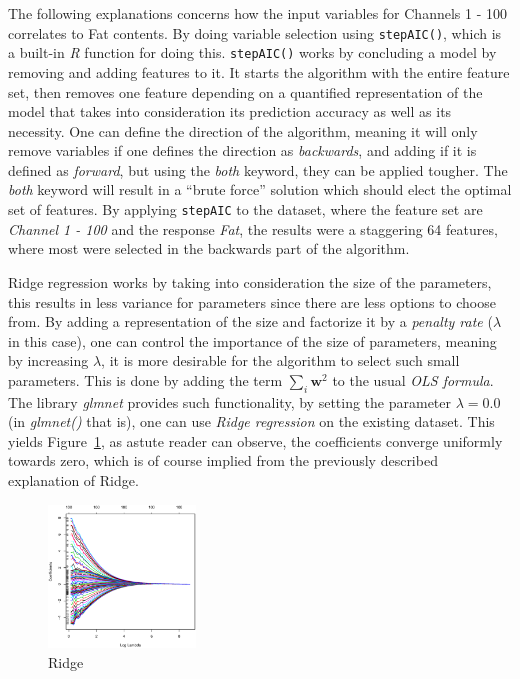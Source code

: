 \documentclass[a4paper, twocolumn]{article}
\begin{document}
        The following explanations concerns how the input variables for Channels 1 - 100 correlates to Fat contents. By doing variable selection using \texttt{stepAIC()}, which is a built-in \emph{R} function for doing this. \texttt{stepAIC()} works by concluding a model by removing and adding features to it. It starts the algorithm with the entire feature set, then removes one feature depending on a quantified representation of the model that takes into consideration its prediction accuracy as well as its necessity. One can define the direction of the algorithm, meaning it will only remove variables if one defines the direction as \emph{backwards}, and adding if it is defined as \emph{forward}, but using the \emph{both} keyword, they can be applied tougher. The \emph{both} keyword will result in a ``brute force'' solution which should elect the optimal set of features. By applying \texttt{stepAIC} to the dataset, where the feature set are \emph{Channel 1 - 100} and the response \emph{Fat}, the results were a staggering 64 features, where most were selected in the backwards part of the algorithm.

        Ridge regression works by taking into consideration the size of the parameters, this results in less variance for parameters since there are less options to choose from. By adding a representation of the size and factorize it by a \emph{penalty rate} ($\lambda$ in this case), one can control the importance of the size of parameters, meaning by increasing $\lambda$, it is more desirable for the algorithm to select such small parameters. This is done by adding the term $\sum_{i}{\mathbf{w}^2}$ to the usual \emph{OLS formula}. The library \emph{glmnet} provides such functionality, by setting the parameter $\lambda = 0.0$ (in \emph{glmnet()} that is), one can use \emph{Ridge regression} on the existing dataset. This yields Figure~\ref{fig:ridge}, as astute reader can observe, the coefficients converge uniformly towards zero, which is of course implied from the previously described explanation of Ridge.

    \begin{figure}[h!]
        \centering
        \caption{Ridge}
        \label{fig:ridge}
        \includegraphics[width=0.35\textwidth]{share/ridge.eps}
    \end{figure}
\end{document}

